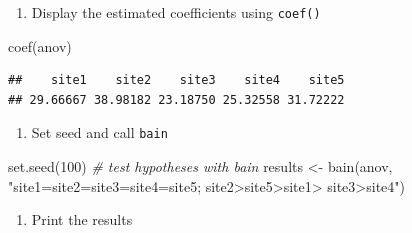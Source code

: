 \documentclass[
]{book}
\newenvironment{Shaded}{\begin{snugshade}}{\end{snugshade}}
\newcommand{\CommentTok}[1]{\textcolor[rgb]{0.56,0.35,0.01}{\textit{#1}}}
\newcommand{\DecValTok}[1]{\textcolor[rgb]{0.00,0.00,0.81}{#1}}
\newcommand{\FunctionTok}[1]{\textcolor[rgb]{0.00,0.00,0.00}{#1}}
\newcommand{\NormalTok}[1]{#1}
\newcommand{\OtherTok}[1]{\textcolor[rgb]{0.56,0.35,0.01}{#1}}
\newcommand{\SpecialCharTok}[1]{\textcolor[rgb]{0.00,0.00,0.00}{#1}}
\newcommand{\StringTok}[1]{\textcolor[rgb]{0.31,0.60,0.02}{#1}}
\providecommand{\tightlist}{%
  \setlength{\itemsep}{0pt}\setlength{\parskip}{0pt}}
\begin{document}
\begin{Shaded}
\end{Shaded}

\begin{enumerate}
\def\labelenumi{\arabic{enumi})}
\setcounter{enumi}{1}
\tightlist
\item
  Display the estimated coefficients using \texttt{coef()}
\end{enumerate}

\begin{Shaded}
\begin{Highlighting}[]
\FunctionTok{coef}\NormalTok{(anov)}
\end{Highlighting}
\end{Shaded}

\begin{verbatim}
##    site1    site2    site3    site4    site5 
## 29.66667 38.98182 23.18750 25.32558 31.72222
\end{verbatim}

\begin{enumerate}
\def\labelenumi{\arabic{enumi})}
\setcounter{enumi}{2}
\tightlist
\item
  Set seed and call \texttt{bain}
\end{enumerate}

\begin{Shaded}
\begin{Highlighting}[]
\FunctionTok{set.seed}\NormalTok{(}\DecValTok{100}\NormalTok{)}
\CommentTok{\# test hypotheses with bain}
\NormalTok{results }\OtherTok{\textless{}{-}} \FunctionTok{bain}\NormalTok{(anov, }\StringTok{"site1=site2=site3=site4=site5; site2\textgreater{}site5\textgreater{}site1\textgreater{}}
\StringTok{site3\textgreater{}site4"}\NormalTok{)}
\end{Highlighting}
\end{Shaded}

\begin{enumerate}
\def\labelenumi{\arabic{enumi})}
\setcounter{enumi}{3}
\tightlist
\item
  Print the results
\end{enumerate}
\end{document}
